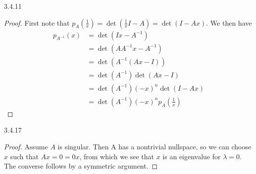 \documentclass{article}
\theoremstyle{definition}
\begin{document}
	\begin{prob}{3.4.11} $  $
		\begin{proof}
			First note that $ p_A(\frac{1}{x}) = \det(\frac{1}{x}I -A) = \det(I-Ax) $. We then have 
				\begin{align*}
					p_{A^{-1}}(x) &= \det(Ix-A^{-1}) \\
					&= \det(AA^{-1}x - A^{-1}) \\
					&= \det(A^{-1}(Ax-I)) \\
					&= \det(A^{-1}) \det(Ax-I) \\
					&= \det(A^{-1}) (-x)^n \det(I-Ax) \\
					&= \det(A^{-1}) (-x)^n p_A\left( \frac{1}{x} \right)
				\end{align*}
		\end{proof}
	\end{prob}

	\begin{prob}{3.4.17} $  $
		\begin{proof}
			Assume $ A $ is singular. Then A has a nontrivial nullspace, so we can choose $ x $ such that $ Ax = 0 = 0x $, from which we see that $ x $ is an eigenvalue for $ \lambda = 0 $. The converse follows by a symmetric argument.
		\end{proof}
	\end{prob}

	


























    
\end{document}
